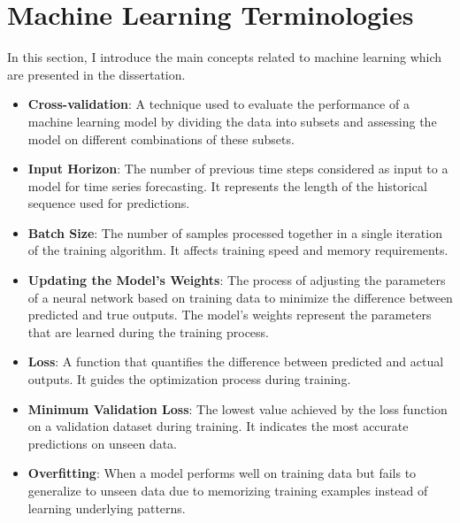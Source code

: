 
\section{Machine Learning Terminologies}
\label{terminologies_appendix}
In this section, I introduce the main concepts related to machine learning which are presented in the dissertation.

\begin{itemize}
    \item \textbf{Cross-validation}: A technique used to evaluate the performance of a machine learning model by dividing the data into subsets and assessing the model on different combinations of these subsets.

    \item \textbf{Input Horizon}: The number of previous time steps considered as input to a model for time series forecasting. It represents the length of the historical sequence used for predictions.
    
    \item \textbf{Batch Size}: The number of samples processed together in a single iteration of the training algorithm. It affects training speed and memory requirements.
    
    \item \textbf{Updating the Model's Weights}: The process of adjusting the parameters of a neural network based on training data to minimize the difference between predicted and true outputs. The model's weights represent the parameters that are learned during the training process.
    
    \item \textbf{Loss}: A function that quantifies the difference between predicted and actual outputs. It guides the optimization process during training.
    
    \item \textbf{Minimum Validation Loss}: The lowest value achieved by the loss function on a validation dataset during training. It indicates the most accurate predictions on unseen data.
    
    \item \textbf{Overfitting}: When a model performs well on training data but fails to generalize to unseen data due to memorizing training examples instead of learning underlying patterns.
    

\end{itemize}
